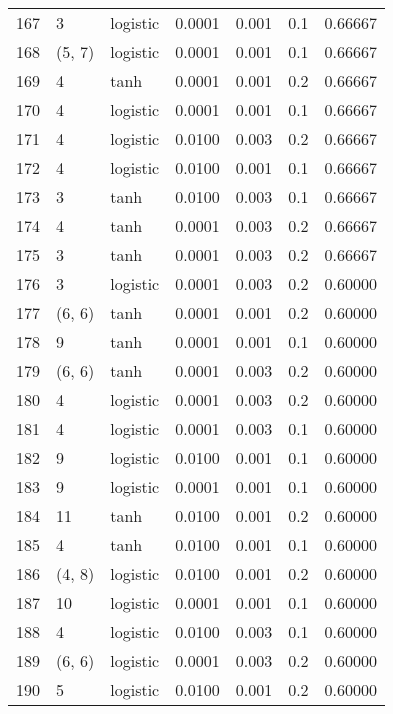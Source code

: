 \begin{tabular}{lllrrrr}
167 &           3 &  logistic &  0.0001 &  0.001 &  0.1 &   0.66667 \\
168 &      (5, 7) &  logistic &  0.0001 &  0.001 &  0.1 &   0.66667 \\
169 &           4 &      tanh &  0.0001 &  0.001 &  0.2 &   0.66667 \\
170 &           4 &  logistic &  0.0001 &  0.001 &  0.1 &   0.66667 \\
171 &           4 &  logistic &  0.0100 &  0.003 &  0.2 &   0.66667 \\
172 &           4 &  logistic &  0.0100 &  0.001 &  0.1 &   0.66667 \\
173 &           3 &      tanh &  0.0100 &  0.003 &  0.1 &   0.66667 \\
174 &           4 &      tanh &  0.0001 &  0.003 &  0.2 &   0.66667 \\
175 &           3 &      tanh &  0.0001 &  0.003 &  0.2 &   0.66667 \\
176 &           3 &  logistic &  0.0001 &  0.003 &  0.2 &   0.60000 \\
177 &      (6, 6) &      tanh &  0.0001 &  0.001 &  0.2 &   0.60000 \\
178 &           9 &      tanh &  0.0001 &  0.001 &  0.1 &   0.60000 \\
179 &      (6, 6) &      tanh &  0.0001 &  0.003 &  0.2 &   0.60000 \\
180 &           4 &  logistic &  0.0001 &  0.003 &  0.2 &   0.60000 \\
181 &           4 &  logistic &  0.0001 &  0.003 &  0.1 &   0.60000 \\
182 &           9 &  logistic &  0.0100 &  0.001 &  0.1 &   0.60000 \\
183 &           9 &  logistic &  0.0001 &  0.001 &  0.1 &   0.60000 \\
184 &          11 &      tanh &  0.0100 &  0.001 &  0.2 &   0.60000 \\
185 &           4 &      tanh &  0.0100 &  0.001 &  0.1 &   0.60000 \\
186 &      (4, 8) &  logistic &  0.0100 &  0.001 &  0.2 &   0.60000 \\
187 &          10 &  logistic &  0.0001 &  0.001 &  0.1 &   0.60000 \\
188 &           4 &  logistic &  0.0100 &  0.003 &  0.1 &   0.60000 \\
189 &      (6, 6) &  logistic &  0.0001 &  0.003 &  0.2 &   0.60000 \\
190 &           5 &  logistic &  0.0100 &  0.001 &  0.2 &   0.60000 \\

\end{tabular}
